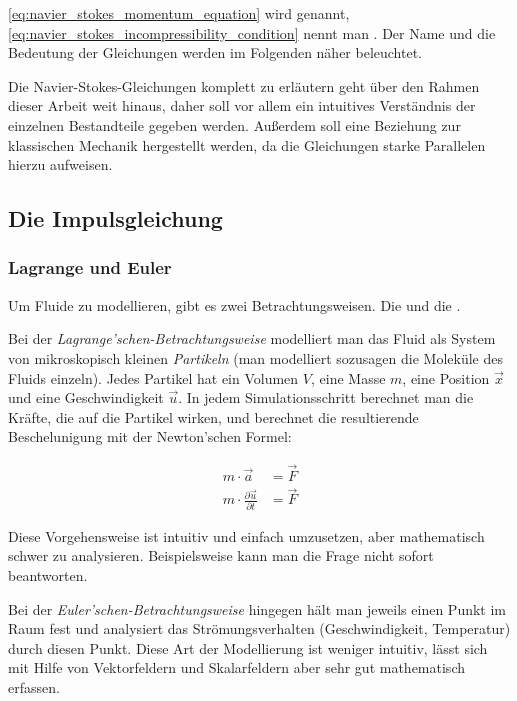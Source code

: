 \autoref{eq:navier_stokes_momentum_equation} wird
 genannt,
\autoref{eq:navier_stokes_incompressibility_condition} nennt man
. Der Name und die Bedeutung der
Gleichungen werden im Folgenden näher beleuchtet.

Die Navier-Stokes-Gleichungen komplett zu erläutern geht über den Rahmen dieser
Arbeit weit hinaus, daher soll vor allem ein intuitives Verständnis der
einzelnen Bestandteile gegeben werden. Außerdem soll eine Beziehung zur
klassischen Mechanik hergestellt werden, da die Gleichungen starke Parallelen
hierzu aufweisen.

\subsection{Die Impulsgleichung}

\subsubsection{Lagrange und Euler}

Um Fluide zu modellieren, gibt es zwei Betrachtungsweisen. Die
 und die
.

Bei der \emph{Lagrange'schen-Betrachtungsweise} modelliert man das Fluid als System
von mikroskopisch kleinen \emph{Partikeln} (man modelliert sozusagen die
Moleküle des Fluids einzeln). Jedes Partikel hat ein Volumen $V$, eine
Masse $m$, eine Position $\vec{x}$ und eine Geschwindigkeit $\vec{u}$. In jedem
Simulationsschritt berechnet man die Kräfte, die auf die Partikel wirken, und
berechnet die resultierende Beschelunigung mit der Newton'schen Formel:

\begin{align*}
m \cdot \vec{a} &= \vec{F} \\
m \cdot \frac{\partial \vec{u}}{\partial t} &= \vec{F}
\end{align*}

Diese Vorgehensweise ist intuitiv und einfach umzusetzen, aber mathematisch
schwer zu analysieren. Beispielsweise kann man die Frage  nicht sofort
beantworten.

Bei der \emph{Euler'schen-Betrachtungsweise} hingegen hält man jeweils einen Punkt im
Raum fest und analysiert das Strömungsverhalten (Geschwindigkeit, Temperatur)
durch diesen Punkt. Diese Art der Modellierung ist weniger intuitiv, lässt sich
mit Hilfe von Vektorfeldern und Skalarfeldern aber sehr gut mathematisch erfassen.

